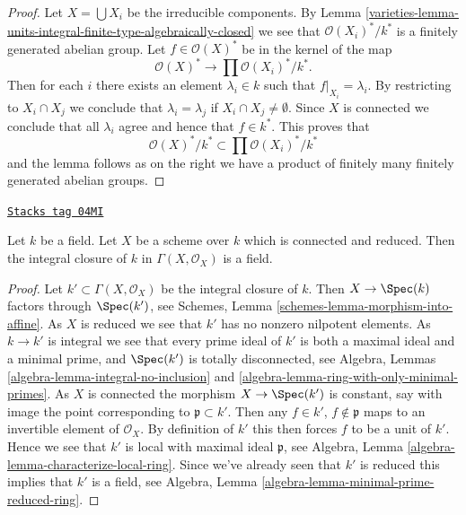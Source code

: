 \begin{proof}

Let $X = \bigcup X_i$ be the irreducible components. By
Lemma \ref{varieties-lemma-units-integral-finite-type-algebraically-closed}
we see that $\mathcal{O}(X_i)^*/k^*$ is a finitely generated
abelian group. Let $f \in \mathcal{O}(X)^*$ be in the kernel
of the map
$$
\mathcal{O}(X)^* \longrightarrow \prod \mathcal{O}(X_i)^*/k^*.
$$
Then for each $i$ there exists an element $\lambda_i \in k$
such that $f|_{X_i} = \lambda_i$.
By restricting to $X_i \cap X_j$ we conclude that
$\lambda_i = \lambda_j$ if $X_i \cap X_j \not = \emptyset$.
Since $X$ is connected we conclude that all $\lambda_i$ agree
and hence that $f \in k^*$. This proves that
$$
\mathcal{O}(X)^*/k^* \subset \prod \mathcal{O}(X_i)^*/k^*
$$
and the lemma follows as on the right we have a product of finitely
many finitely generated abelian groups.
\end{proof}

\begin{lemma}
\label{varieties-lemma-integral-closure-ground-field}
\href{https://stacks.math.columbia.edu/tag/04MI}{\texttt{Stacks tag 04MI}}

Let $k$ be a field.
Let $X$ be a scheme over $k$ which is connected and reduced.
Then the integral closure of $k$ in $\Gamma(X, \mathcal{O}_X)$
is a field.
\end{lemma}

\begin{proof}
Let $k' \subset \Gamma(X, \mathcal{O}_X)$ be the integral closure of
$k$. Then $X \to \Spec(k)$ factors through $\Spec(k')$, see
Schemes, Lemma \ref{schemes-lemma-morphism-into-affine}.
As $X$ is reduced we see that $k'$ has no nonzero nilpotent elements.
As $k \to k'$ is integral we see that every prime ideal of $k'$ is
both a maximal ideal and a minimal prime,
and $\Spec(k')$ is totally disconnected, see
Algebra, Lemmas \ref{algebra-lemma-integral-no-inclusion} and
\ref{algebra-lemma-ring-with-only-minimal-primes}.
As $X$ is connected the morphism $X \to \Spec(k')$ is
constant, say with image the point corresponding to
$\mathfrak p \subset k'$. Then any $f \in k'$, $f \not \in \mathfrak p$
maps to an invertible element of $\mathcal{O}_X$. By definition
of $k'$ this then forces $f$ to be a unit of $k'$. Hence we see
that $k'$ is local with maximal ideal $\mathfrak p$, see
Algebra, Lemma \ref{algebra-lemma-characterize-local-ring}.
Since we've already seen that $k'$ is reduced this implies that
$k'$ is a field, see
Algebra, Lemma \ref{algebra-lemma-minimal-prime-reduced-ring}.
\end{proof}

